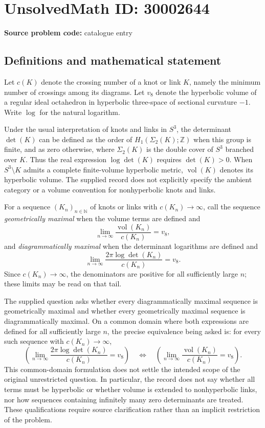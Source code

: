 \documentclass[11pt]{article}
\newcommand{\N}{\mathbb{N}}
\newcommand{\Z}{\mathbb{Z}}
\begin{document}
\section*{UnsolvedMath ID: 30002644}
\textbf{Source problem code:} catalogue entry
\subsection{Definitions and mathematical statement}
Let $c(K)$ denote the crossing number of a knot or link $K$, namely the minimum number of crossings among its diagrams. Let $v_8$ denote the hyperbolic volume of a regular ideal octahedron in hyperbolic three-space of sectional curvature $-1$. Write $\log$ for the natural logarithm.

Under the usual interpretation of knots and links in $S^3$, the determinant $\det(K)$ can be defined as the order of $H_1(\Sigma_2(K);\Z)$ when this group is finite, and as zero otherwise, where $\Sigma_2(K)$ is the double cover of $S^3$ branched over $K$. Thus the real expression $\log\det(K)$ requires $\det(K)>0$. When $S^3\setminus K$ admits a complete finite-volume hyperbolic metric, $\operatorname{vol}(K)$ denotes its hyperbolic volume. The supplied record does not explicitly specify the ambient category or a volume convention for nonhyperbolic knots and links.

For a sequence $(K_n)_{n\in\N}$ of knots or links with $c(K_n)\to\infty$, call the sequence \emph{geometrically maximal} when the volume terms are defined and
\[
\lim_{n\to\infty}\frac{\operatorname{vol}(K_n)}{c(K_n)}=v_8,
\]
and \emph{diagrammatically maximal} when the determinant logarithms are defined and
\[
\lim_{n\to\infty}\frac{2\pi\log\det(K_n)}{c(K_n)}=v_8.
\]
Since $c(K_n)\to\infty$, the denominators are positive for all sufficiently large $n$; these limits may be read on that tail.

The supplied question asks whether every diagrammatically maximal sequence is geometrically maximal and whether every geometrically maximal sequence is diagrammatically maximal. On a common domain where both expressions are defined for all sufficiently large $n$, the precise equivalence being asked is: for every such sequence with $c(K_n)\to\infty$,
\[
\left(\lim_{n\to\infty}\frac{2\pi\log\det(K_n)}{c(K_n)}=v_8\right)
\quad\Longleftrightarrow\quad
\left(\lim_{n\to\infty}\frac{\operatorname{vol}(K_n)}{c(K_n)}=v_8\right).
\]
This common-domain formulation does not settle the intended scope of the original unrestricted question. In particular, the record does not say whether all terms must be hyperbolic or whether volume is extended to nonhyperbolic links, nor how sequences containing infinitely many zero determinants are treated. These qualifications require source clarification rather than an implicit restriction of the problem.
\end{document}
